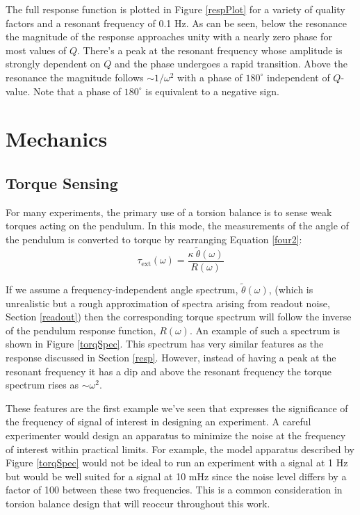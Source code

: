 \documentclass{book}
\begin{document}
The full response function is plotted in Figure \ref{respPlot} for a variety of quality factors and a resonant frequency of 0.1 Hz. As can be seen, below the resonance the magnitude of the response approaches unity with a nearly zero phase for most values of $Q$. There's a peak at the resonant frequency whose amplitude is strongly dependent on $Q$ and the phase undergoes a rapid transition. Above the resonance the magnitude follows $\sim1/\omega^2$ with a phase of $180^\circ$ independent of $Q$-value. Note that a phase of $180^\circ$ is equivalent to a negative sign.


\chapter{Mechanics}
\section{Torque Sensing}

\quad For many experiments, the primary use of a torsion balance is to sense weak torques acting on the pendulum. In this mode, the measurements of the angle of the pendulum is converted to torque by rearranging Equation \ref{four2}:
\begin{equation}
\tau_{\text{ext}} (\omega)= \frac{\kappa\ \tilde{\theta}(\omega)}{R(\omega)} \label{torq}
\end{equation}

If we assume a frequency-independent angle spectrum, $\tilde{\theta}(\omega)$, (which is unrealistic but a rough approximation of spectra arising from readout noise, Section \ref{readout}) then the corresponding torque spectrum will follow the inverse of the pendulum response function, $R(\omega)$. An example of such a spectrum is shown in Figure \ref{torqSpec}. This spectrum has very similar features as the response discussed in Section \ref{resp}. However, instead of having a peak at the resonant frequency it has a dip and above the resonant frequency the torque spectrum rises as $\sim \omega^2$. 

These features are the first example we've seen that expresses the significance of the frequency of signal of interest in designing an experiment. A careful experimenter would design an apparatus to minimize the noise at the frequency of interest within practical limits. For example, the model apparatus described by Figure \ref{torqSpec} would not be ideal to run an experiment with a signal at 1 Hz but would be well suited for a signal at 10 mHz since the noise level differs by a factor of 100 between these two frequencies. This is a common consideration in torsion balance design that will reoccur throughout this work.
\end{document}
